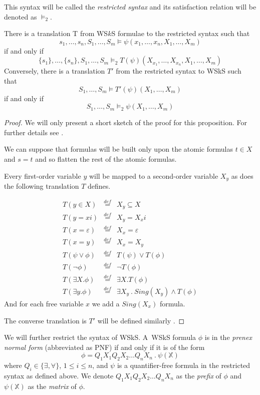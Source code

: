 	This syntax will be called the \emph{restricted syntax} and its satisfaction relation will be denoted as $\vDash_2$.
	
	\begin{prop}
	There is a translation T from WS$k$S formulae to the restricted syntax such that $$s_1,\ldots,s_n,S_1,\ldots,S_m \vDash \psi(x_1,\ldots,x_n,X_1,\ldots,X_m)$$ if and only if $$\{s_1\},\ldots,\{s_n\},S_1,\ldots,S_m \vDash_2 T(\psi)(X_{x_1},\ldots,X_{x_n}, X_1,\ldots,X_m)$$ Conversely, there is a translation $T'$ from the restricted syntax to WSkS such that $$S_1,\ldots,S_m \vDash T'(\psi)(X_1,\ldots,X_m)$$ if and only if $$S_1,\ldots,S_m \vDash_2 \psi(X_1,\ldots,X_m)$$
	\end{prop}
	\begin{proof}
	We will only present a short sketch of the proof for this proposition. For further details see \cite{tata}.
	
	We can suppose that formulas will be built only upon the atomic formulas $t \in X$ and $s = t$ and so flatten the rest of the atomic formulas.
	
	Every first-order variable $y$ will be mapped to a second-order variable $X_y$ as does the following translation $T$ defines.
	
	 \begin{eqnarray*}
	 T(y \in X) & \overset{def}{=} & X_y \subseteq X\\
	 T(y = xi) & \overset{def}{=} &  X_y = X_xi\\
	 T(x = \varepsilon) & \overset{def}{=} & X_x = \varepsilon\\
	 T(x = y) & \overset{def}{=} & X_x = X_y\\
	 T(\psi \vee \phi) & \overset{def}{=} & T(\psi) \vee T(\phi)\\
	 T(\neg\phi) & \overset{def}{=} & \neg T(\phi)\\
	 T(\exists X.\phi) & \overset{def}{=} & \exists X.T(\phi)\\
	 T(\exists y.\phi) & \overset{def}{=} & \exists X_y\ .\ Sing(X_y) \wedge T(\phi)
	 \end{eqnarray*}
	And for each free variable $x$ we add a $Sing(X_x)$ formula. 
	
	The converse translation is $T'$ will be defined similarly \cite{tata}.
	\end{proof}
	
	We will further restrict the syntax of WSkS. A~WSkS formula $\phi$ is in the \emph{prenex normal form} (abbreviated as PNF) if and only if it is of the form $$\phi = Q_1X_1Q_2X_2\ldots Q_nX_n\ .\ \psi(\mathds{X})$$ where  $Q_i \in \{\exists,\forall\}$, $1 \leq i \leq n$, and $\psi$ is a quantifier-free formula in the restricted syntax as defined above. We denote $Q_1X_1Q_2X_2\ldots Q_nX_n$ as the \emph{prefix} of $\phi$ and $\psi(\mathds{X})$ as the \emph{matrix} of $\phi$.
	
